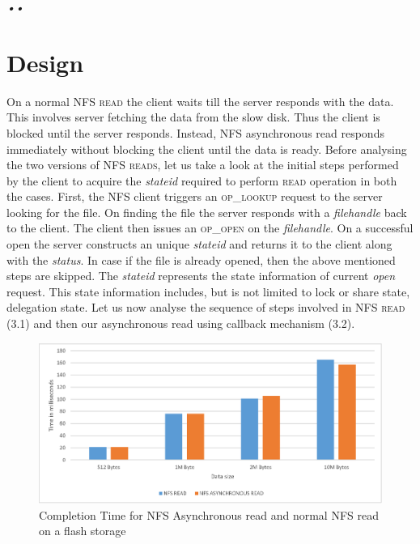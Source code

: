 \textit{\emph{•\emph{\textit{•}}}}\section{Design}

\label{Design}

On a normal \textsc{NFS read} the client waits till the server responds with the data. This involves server fetching the data from the slow disk. Thus the client is blocked until the server responds. Instead, NFS asynchronous read responds immediately without blocking the client until the data is ready. Before analysing the two versions of \textsc{NFS reads}, let us take a look at the initial steps performed by the client to acquire the \textit{stateid} required to perform \textsc{read} operation in both the cases. First, the NFS client triggers an \textsc{op\_lookup} request to the server looking for the file. On finding the file the server responds with a \textit{filehandle} back to the client. The client then issues an \textsc{op\_open} on the \textit{filehandle}. On a successful open the server constructs an unique \textit{stateid} and returns it to the client along with the \textit{status}. In case if the file is already opened, then the above mentioned steps are skipped. The \textit{stateid} represents the state information of current \textit{open} request. This state information includes, but is not limited to lock or share state, delegation state. Let us now analyse the sequence of steps involved in \textsc{NFS read} (3.1) and then our asynchronous read using callback mechanism (3.2).

\begin{figure}
\centering
\includegraphics[scale=1.0]{figures/completion_time.eps}
\caption{Completion	Time for NFS Asynchronous read and normal NFS read on a flash storage}
\label{fig:NFSCompletionTimes}
\end{figure}  

